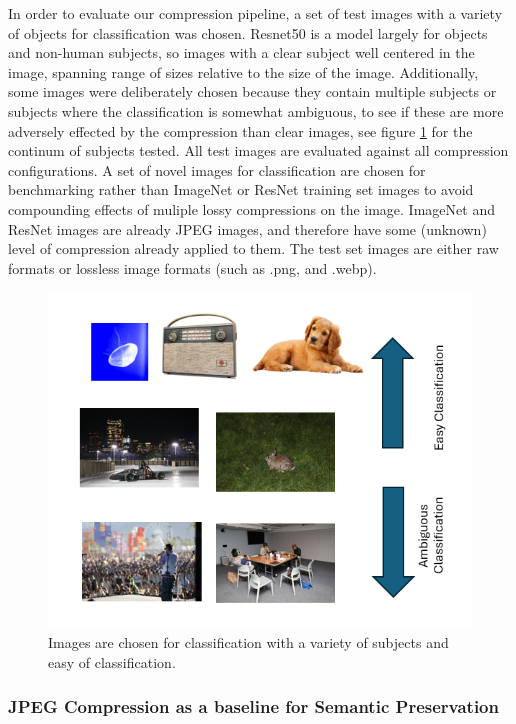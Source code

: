 In order to evaluate our compression pipeline, a set of test images with a variety of objects for classification was chosen. 
Resnet50 is a model largely for objects and non-human subjects, so images with a clear subject well centered in the image, spanning range of sizes relative to the size of the image. 
Additionally, some images were deliberately chosen because they contain multiple subjects or subjects where the classification is somewhat ambiguous, to see if these are more adversely effected by the compression than clear images, see figure \ref{fig:test_images} for the continum of subjects tested. 
All test images are evaluated against all compression configurations. A set of novel images for classification are chosen for benchmarking rather than ImageNet or ResNet training set images to avoid compounding effects of muliple lossy compressions on the image. 
ImageNet and ResNet images are already JPEG images, and therefore have some (unknown) level of compression already applied to them. The test set images are either raw formats or lossless image formats (such as .png, and .webp).

\begin{figure}
    \includegraphics{assets/Classification Sweep.png}
    \caption{Images are chosen for classification with a variety of subjects and easy of classification.}
    \label{fig:test_images}
\end{figure}

\subsubsection{JPEG Compression as a baseline for Semantic Preservation}

